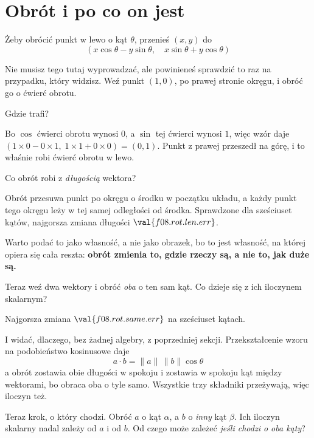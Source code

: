 \section{Obrót i po co on jest}
\label{sec:F08-rotation}

\begin{fr}
Żeby obrócić punkt w lewo o kąt $\theta$, przenieś $(x, y)$ do
\[ (x\cos\theta - y\sin\theta,\quad x\sin\theta + y\cos\theta) \]

Nie musisz tego tutaj wyprowadzać, ale powinieneś sprawdzić to raz na
przypadku, który widzisz. Weź punkt $(1, 0)$, po prawej stronie okręgu, i
obróć go o ćwierć obrotu.

Gdzie trafi?
\nextframe
\end{fr}

\begin{fr}
Bo $\cos$ ćwierci obrotu wynosi $0$, a $\sin$ tej ćwierci wynosi $1$, więc
wzór daje $(1 \times 0 - 0 \times 1,\; 1 \times 1 + 0 \times 0) = (0, 1)$.
Punkt z prawej przeszedł na górę, i to właśnie robi ćwierć obrotu w lewo.

Co obrót robi z \emph{długością} wektora?
\nextframe
\end{fr}

\begin{fr}
Obrót przesuwa punkt po okręgu o środku w początku układu, a każdy punkt tego
okręgu leży w tej samej odległości od środka. Sprawdzone dla sześciuset
kątów, najgorsza zmiana długości $\val{f08.rot.len.err}$.

Warto podać to jako własność, a nie jako obrazek, bo to jest własność, na
której opiera się cała reszta: \textbf{obrót zmienia to, gdzie rzeczy są, a
nie to, jak duże są.}

Teraz weź dwa wektory i obróć \emph{oba} o ten sam kąt. Co dzieje się z ich
iloczynem skalarnym?
\nextframe
\end{fr}

\begin{fr}
Najgorsza zmiana $\val{f08.rot.same.err}$ na sześciuset kątach.

I widać, dlaczego, bez żadnej algebry, z poprzedniej sekcji. Przekształcenie
wzoru na podobieństwo kosinusowe daje
\[ a \cdot b = \lVert a \rVert\, \lVert b \rVert \cos\theta \]
a obrót zostawia obie
długości w spokoju i zostawia w spokoju kąt między wektorami, bo obraca oba o
tyle samo. Wszystkie trzy składniki przeżywają, więc iloczyn też.

Teraz krok, o który chodzi. Obróć $a$ o kąt $\alpha$, a $b$ o \emph{inny} kąt
$\beta$. Ich iloczyn skalarny nadal zależy od $a$ i od $b$. Od czego może
zależeć \emph{jeśli chodzi o oba kąty}?
\nextframe
\end{fr}

